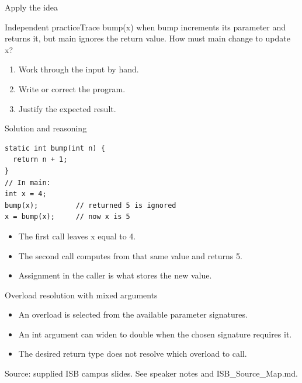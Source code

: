 \documentclass[10pt,aspectratio=169]{beamer}
\begin{document}
\begin{frame}[fragile,t]{Apply the idea}
\begin{alertblock}{Independent practice}Trace bump(x) when bump increments its parameter and returns it, but main ignores the return value. How must main change to update x?\end{alertblock}\vspace{3mm}\begin{enumerate}\item Work through the input by hand.\item Write or correct the program.\item Justify the expected result.\end{enumerate}
\end{frame}

\begin{frame}[fragile,t]{Solution and reasoning}
\begin{lstlisting}
static int bump(int n) {
  return n + 1;
}
// In main:
int x = 4;
bump(x);         // returned 5 is ignored
x = bump(x);     // now x is 5
\end{lstlisting}\vspace{1mm}\small\begin{itemize}
\item The first call leaves x equal to 4.
\item The second call computes from that same value and returns 5.
\item Assignment in the caller is what stores the new value.
\end{itemize}
\end{frame}

\begin{frame}[fragile,t]{Overload resolution with mixed arguments}
\begin{itemize}
\item An overload is selected from the available parameter signatures.
\item An int argument can widen to double when the chosen signature requires it.
\item The desired return type does not resolve which overload to call.
\end{itemize}
\vspace{3mm}\footnotesize\textcolor{accent}{Source: supplied ISB campus slides. See speaker notes and ISB\_Source\_Map.md.}
\end{frame}
\end{document}
